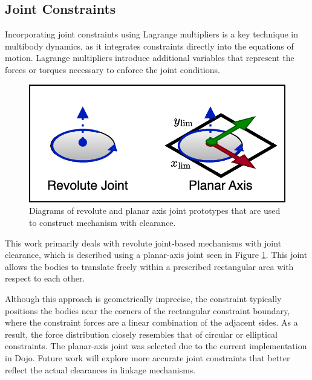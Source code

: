 \subsection{Joint Constraints}
Incorporating joint constraints using Lagrange multipliers is a key technique in multibody dynamics, as it integrates constraints directly into the equations of motion. Lagrange multipliers introduce additional variables that represent the forces or torques necessary to enforce the joint conditions.
\begin{figure}
    \centering
    \includegraphics[width=0.8\linewidth]{Figures/joint_description.drawio.png}
    \caption{Diagrams of revolute and planar axis joint prototypes that are used to construct mechanism with clearance.}
    \label{fig:joint-proto}
\end{figure}
This work primarily deals with revolute joint-based mechanisms with joint clearance,  which is described using a planar-axis joint seen in Figure \ref{fig:joint-proto}. This joint allows the bodies to translate freely within a prescribed rectangular area with respect to each other. 

Although this approach is geometrically imprecise, the constraint typically positions the bodies near the corners of the rectangular constraint boundary, where the constraint forces are a linear combination of the adjacent sides. As a result, the force distribution closely resembles that of circular or elliptical constraints. The planar-axis joint was selected due to the current implementation in Dojo. Future work will explore more accurate joint constraints that better reflect the actual clearances in linkage mechanisms.

